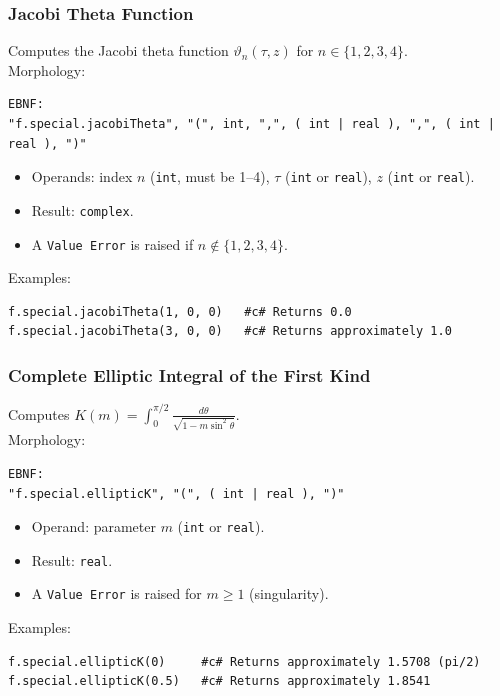 \subsubsection{Jacobi Theta Function}
Computes the Jacobi theta function $\vartheta_n(\tau, z)$ for $n \in \{1, 2, 3, 4\}$. \\
Morphology:
\begin{verbatim}
EBNF:
"f.special.jacobiTheta", "(", int, ",", ( int | real ), ",", ( int | real ), ")"
\end{verbatim}
\begin{itemize}
\item Operands: index $n$ (\texttt{int}, must be 1--4), $\tau$ (\texttt{int} or \texttt{real}), $z$ (\texttt{int} or \texttt{real}).
\item Result: \texttt{complex}.
\item A \texttt{Value Error} is raised if $n \notin \{1, 2, 3, 4\}$.
\end{itemize}
Examples:
\begin{verbatim}
f.special.jacobiTheta(1, 0, 0)   #c# Returns 0.0
f.special.jacobiTheta(3, 0, 0)   #c# Returns approximately 1.0
\end{verbatim}

\subsubsection{Complete Elliptic Integral of the First Kind}
Computes $K(m) = \int_0^{\pi/2} \frac{d\theta}{\sqrt{1 - m \sin^2\theta}}$. \\
Morphology:
\begin{verbatim}
EBNF:
"f.special.ellipticK", "(", ( int | real ), ")"
\end{verbatim}
\begin{itemize}
\item Operand: parameter $m$ (\texttt{int} or \texttt{real}).
\item Result: \texttt{real}.
\item A \texttt{Value Error} is raised for $m \geq 1$ (singularity).
\end{itemize}
Examples:
\begin{verbatim}
f.special.ellipticK(0)     #c# Returns approximately 1.5708 (pi/2)
f.special.ellipticK(0.5)   #c# Returns approximately 1.8541
\end{verbatim}

